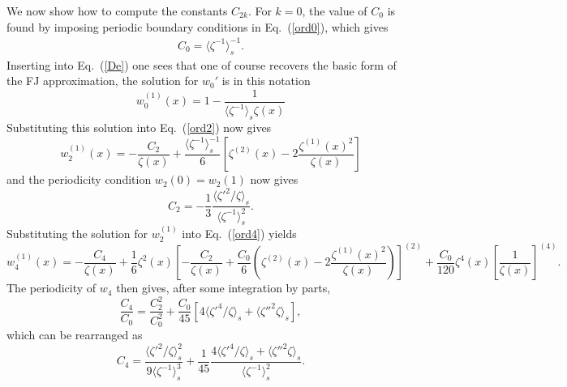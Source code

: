 \documentclass[pre,showpacs,preprintnumbers,amsmath,amssymb,superscriptaddress]{revtex4-1}
\begin{document}
{{We now show how to compute the constants $C_{2k}$. For $k=0$, the value of $C_0$ is found by 
imposing periodic boundary conditions in Eq.~(\ref{ord0}), which gives 
\begin{align}
C_0 = \langle \zeta^{-1}\rangle_s^{-1}.
\end{align}
Inserting into Eq.~(\ref{De}) one sees that one of course recovers the basic form of the FJ approximation, the solution for $w_0'$ is in this notation
\begin{equation}
w_0^{(1)}(x) = 1-  \frac{1}{\langle \zeta^{-1}\rangle_s\zeta(x)}
\end{equation}
Substituting this solution into Eq.~(\ref{ord2}) now gives
\begin{equation}
w_2^{(1)}(x) = -\frac{C_2}{\zeta(x)} +\frac{\langle \zeta^{-1}\rangle^{-1}_s}{6}\left[\zeta^{(2)}(x)- 2 \frac{\zeta^{(1)}(x)^2}{\zeta(x)}\right]
\end{equation}
and the periodicity condition $w_2(0)=w_2(1)$ now gives
\begin{equation}
C_2 = -\frac{1}{3}\frac{\langle \zeta'^2/\zeta\rangle_s}{\langle \zeta^{-1}\rangle_s^2} .
\end{equation}
Substituting the solution for $w^{(1)}_2$ into Eq.~(\ref{ord4}) yields
\begin{equation}
w_4^{(1)}(x) = -\frac{C_4}{\zeta(x)} +\frac{1}{6}\zeta^2(x) \left[ -\frac{C_2}{\zeta(x)} +\frac{C_0}{6}\left(\zeta^{(2)}(x)- 2 \frac{\zeta^{(1)}(x)^2}{\zeta(x)}\right)\right]^{(2)}+\frac{C_0}{120}\zeta^{4}(x)\left[\frac{1}{\zeta(x)}\right]^{(4)}.
\end{equation}
The periodicity of $w_4$ then gives, after some integration by parts, 
\begin{equation}
\frac{C_4}{C_0} = \frac{C_2^2}{C_0^2} + \frac{C_0}{45} \left[ 4 \langle \zeta'^4/\zeta \rangle_s +  \langle \zeta''^2\zeta\rangle_s \right] ,
\end{equation}
which can be rearranged as
\begin{equation}
C_4 = \frac{\langle \zeta'^2/\zeta\rangle_s^2}{9 \langle \zeta^{-1} \rangle_s^3} + \frac{1}{45} \frac{4 \langle \zeta'^4/\zeta \rangle_s +  \langle \zeta''^2\zeta\rangle_s}{\langle \zeta^{-1} \rangle_s^2}.
\end{equation}

}}
\end{document}
